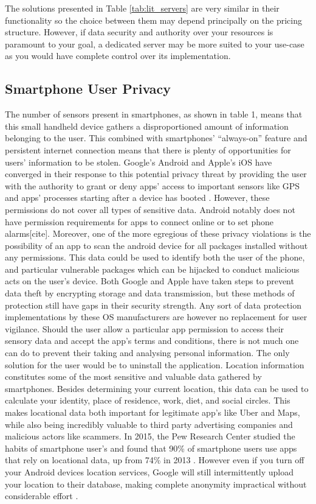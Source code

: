 The solutions presented in Table \ref{tab:lit_servers} are very similar in their functionality so the choice between them may depend principally on the pricing structure. However, if data security and authority over your resources is paramount to your goal, a dedicated server may be more suited to your use-case as you would have complete control over its implementation.

\subsection{Smartphone User Privacy}
The number of sensors present in smartphones, as shown in table 1, means that this small handheld device gathers a disproportioned amount of information belonging to the user. This combined with smartphones’ “always-on” feature and persistent internet connection means that there is plenty of opportunities for users’ information to be stolen. Google’s Android and Apple’s iOS have converged in their response to this potential privacy threat by providing the user with the authority to grant or deny apps’ access to important sensors like GPS and apps’ processes starting after a device has booted \cite{RR-1393-DARPA}. However, these permissions do not cover all types of sensitive data. Android notably does not have permission requirements for apps to connect online or to set phone alarms[cite]. Moreover, one of the more egregious of these privacy violations is the possibility of an app to scan the android device for all packages installed without any permissions. This data could be used to identify both the user of the phone, and particular vulnerable packages which can be hijacked to conduct malicious acts on the user’s device\cite{RR-1393-DARPA}. 
Both Google and Apple have taken steps to prevent data theft by encrypting storage and data transmission, but these methods of protection still have gaps in their security strength. Any sort of data protection implementations by these OS manufacturers are however no replacement for user vigilance. Should the user allow a particular app permission to access their sensory data and accept the app’s terms and conditions, there is not much one can do to prevent their taking and analysing personal information. The only solution for the user would be to uninstall the application.
Location information constitutes some of the most sensitive and valuable data gathered by smartphones. Besides determining your current location, this data can be used to calculate your identity, place of residence, work, diet, and social circles. This makes locational data both important for legitimate app’s like Uber and Maps, while also being incredibly valuable to third party advertising companies and malicious actors like scammers. In 2015, the Pew Research Center studied the habits of smartphone user’s and found that 90\% of smartphone users use apps that rely on locational data, up from 74\% in 2013 \cite{Anderson2016}. However even if you turn off your Android devices location services, Google will still intermittently upload your location to their database, making complete anonymity impractical without considerable effort \cite{AssociatedPress2018}.


